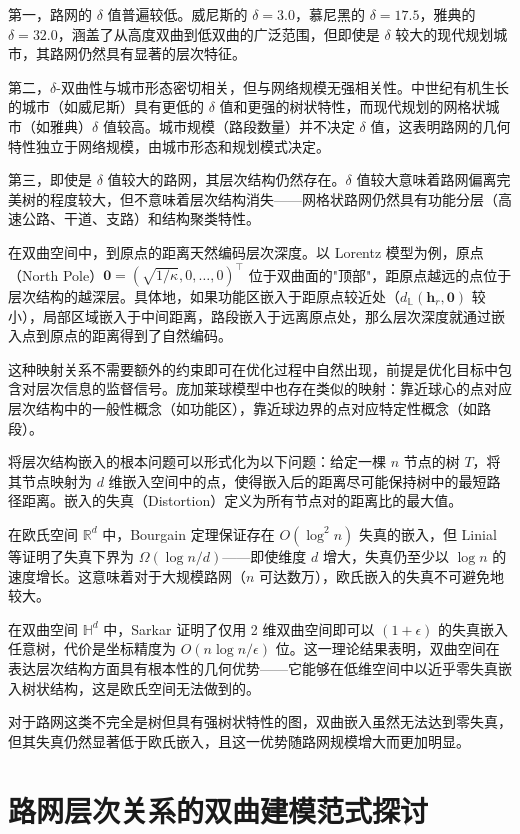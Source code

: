 第一，路网的 $\delta$ 值普遍较低。威尼斯的 $\delta=3.0$，慕尼黑的 $\delta=17.5$，雅典的 $\delta=32.0$，涵盖了从高度双曲到低双曲的广泛范围，但即使是 $\delta$ 较大的现代规划城市，其路网仍然具有显著的层次特征。

第二，$\delta$-双曲性与城市形态密切相关，但与网络规模无强相关性。中世纪有机生长的城市（如威尼斯）具有更低的 $\delta$ 值和更强的树状特性，而现代规划的网格状城市（如雅典）$\delta$ 值较高。城市规模（路段数量）并不决定 $\delta$ 值，这表明路网的几何特性独立于网络规模，由城市形态和规划模式决定。

第三，即使是 $\delta$ 值较大的路网，其层次结构仍然存在。$\delta$ 值较大意味着路网偏离完美树的程度较大，但不意味着层次结构消失——网格状路网仍然具有功能分层（高速公路、干道、支路）和结构聚类特性。

在双曲空间中，到原点的距离天然编码层次深度。以 Lorentz 模型为例，原点（North Pole）$\mathbf{0} = (\sqrt{1/\kappa}, 0, \ldots, 0)^\top$ 位于双曲面的"顶部"，距原点越远的点位于层次结构的越深层。具体地，如果功能区嵌入于距原点较近处（$d_{\mathbb{L}}(\mathbf{h}_r, \mathbf{0})$ 较小），局部区域嵌入于中间距离，路段嵌入于远离原点处，那么层次深度就通过嵌入点到原点的距离得到了自然编码。

这种映射关系不需要额外的约束即可在优化过程中自然出现，前提是优化目标中包含对层次信息的监督信号。庞加莱球模型中也存在类似的映射：靠近球心的点对应层次结构中的一般性概念（如功能区），靠近球边界的点对应特定性概念（如路段）。

将层次结构嵌入的根本问题可以形式化为以下问题：给定一棵 $n$ 节点的树 $T$，将其节点映射为 $d$ 维嵌入空间中的点，使得嵌入后的距离尽可能保持树中的最短路径距离。嵌入的失真（Distortion）定义为所有节点对的距离比的最大值。

在欧氏空间 $\mathbb{R}^d$ 中，Bourgain 定理保证存在 $O(\log^2 n)$ 失真的嵌入，但 Linial 等证明了失真下界为 $\Omega(\log n / d)$——即使维度 $d$ 增大，失真仍至少以 $\log n$ 的速度增长。这意味着对于大规模路网（$n$ 可达数万），欧氏嵌入的失真不可避免地较大。

在双曲空间 $\mathbb{H}^d$ 中，Sarkar\cite{sarkar2011low} 证明了仅用 2 维双曲空间即可以 $(1+\epsilon)$ 的失真嵌入任意树，代价是坐标精度为 $O(n \log n / \epsilon)$ 位。这一理论结果表明，双曲空间在表达层次结构方面具有根本性的几何优势——它能够在低维空间中以近乎零失真嵌入树状结构，这是欧氏空间无法做到的。

对于路网这类不完全是树但具有强树状特性的图，双曲嵌入虽然无法达到零失真，但其失真仍然显著低于欧氏嵌入，且这一优势随路网规模增大而更加明显。

\section{路网层次关系的双曲建模范式探讨}

